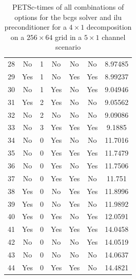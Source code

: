 \begin{table}[h]
\begin{tabular}{ccccccc}
    28 & No & 1 & No & No & No & 8.97485 \\
    29 & Yes & 1 & No & Yes & Yes & 8.99237 \\
    30 & No & 1 & Yes & No & Yes & 9.04946 \\
    31 & Yes & 2 & Yes & No & No & 9.05562 \\
    32 & No & 2 & No & No & No & 9.09086 \\
    33 & No & 3 & Yes & Yes & Yes & 9.1885 \\
    34 & No & 0 & Yes & No & No & 11.7016 \\
    35 & No & 0 & Yes & Yes & Yes & 11.7479 \\
    36 & No & 0 & Yes & No & Yes & 11.7506 \\
    37 & No & 0 & Yes & Yes & No & 11.751 \\
    38 & Yes & 0 & No & Yes & Yes & 11.8996 \\
    39 & Yes & 0 & No & Yes & No & 11.9892 \\
    40 & Yes & 0 & Yes & No & Yes & 12.0591 \\
    41 & Yes & 0 & Yes & Yes & Yes & 14.0458 \\
    42 & No & 0 & No & No & Yes & 14.0519 \\
    43 & No & 0 & No & No & No & 14.0637 \\
    44 & Yes & 0 & Yes & Yes & No & 14.4821 \\
    \hline
  \end{tabular}
  \caption{PETSc-times of all combinations of options for the bcgs solver and ilu preconditioner for a $4 \times 1$ decomposition on a $256 \times 64$ grid in a $5 \times 1$ channel scenario}
  \label{fig:petsc-opt-bcgs-4x1}
\end{table}

